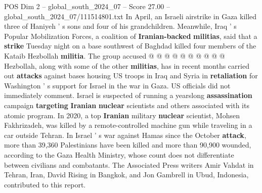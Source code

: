 \begin{textsample}{POS Dim 2 – global\_south\_2024\_07 – Score 27.00 – global\_south\_2024\_07/111514801.txt}
In April, an Israeli airstrike in Gaza killed three of Haniyeh ' s sons and four of his grandchildren.
Meanwhile, Iraq ' s Popular Mobilization Forces, a coalition of \textbf{Iranian-backed} \textbf{militias}, said that a \textbf{strike} Tuesday night on a base southwest of Baghdad killed four members of the Kataib Hezbollah \textbf{militia}.
The group accused @ @ @ @ @ @ @ @ @ @ Hezbollah, along with some of the other \textbf{militias}, has in recent months carried out \textbf{attacks} against bases housing US troops in Iraq and Syria in \textbf{retaliation} for Washington ' s support for Israel in the war in Gaza.
US officials did not immediately comment.
Israel is suspected of running a yearslong \textbf{assassination} campaign \textbf{targeting} \textbf{Iranian} \textbf{nuclear} scientists and others associated with its atomic program.
In 2020, a top \textbf{Iranian} military \textbf{nuclear} scientist, Mohsen Fakhrizadeh, was killed by a remote-controlled machine gun while traveling in a car outside Tehran.
In Israel ' s war against Hamas since the October \textbf{attack}, more than 39,360 Palestinians have been killed and more than 90,900 wounded, according to the Gaza Health Ministry, whose count does not differentiate between civilians and combatants.
The Associated Press writers Amir Vahdat in Tehran, Iran, David Rising in Bangkok, and Jon Gambrell in Ubud, Indonesia, contributed to this report.

\end{textsample}
